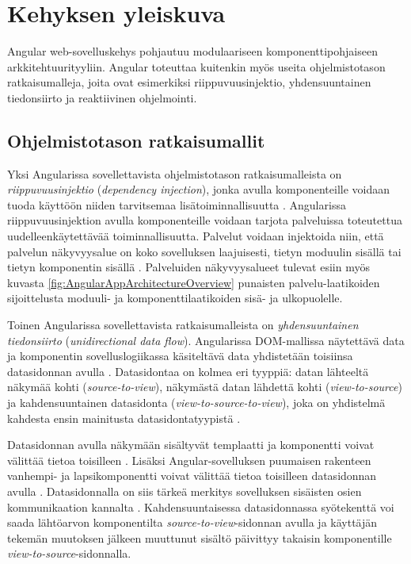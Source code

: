 \documentclass[finnish]{tktltiki2}
\theoremstyle{definition}
\theoremstyle{remark}
\numberwithin{figure}{section}
\begin{document}
\section{Kehyksen yleiskuva}

Angular web-sovelluskehys pohjautuu modulaariseen komponenttipohjaiseen arkkitehtuurityyliin. Angular toteuttaa kuitenkin myös useita ohjelmistotason ratkaisumalleja, joita ovat esimerkiksi riippuvuusinjektio, yhdensuuntainen tiedonsiirto ja reaktiivinen ohjelmointi.

\subsection{Ohjelmistotason ratkaisumallit}

Yksi Angularissa sovellettavista ohjelmistotason ratkaisumalleista on \textit{riippuvuusinjektio} (\textit{dependency injection}), jonka avulla komponenteille voidaan tuoda käyttöön niiden tarvitsemaa lisätoiminnallisuutta \cite{DependencyInjectionPattern}. Angularissa riippuvuusinjektion avulla komponenteille voidaan tarjota palveluissa toteutettua uudelleenkäytettävää toiminnallisuutta. Palvelut voidaan injektoida niin, että palvelun näkyvyysalue on koko sovelluksen laajuisesti, tietyn moduulin sisällä tai tietyn komponentin sisällä \cite{DependencyInjection}. Palveluiden näkyvyysalueet tulevat esiin myös kuvasta \ref{fig:AngularAppArchitectureOverview} punaisten palvelu-laatikoiden sijoittelusta moduuli- ja komponenttilaatikoiden sisä- ja ulkopuolelle.

Toinen Angularissa sovellettavista ratkaisumalleista on \textit{yhdensuuntainen tiedonsiirto} (\textit{unidirectional data flow}). Angularissa DOM-mallissa näytettävä data ja komponentin sovelluslogiikassa käsiteltävä data yhdistetään toisiinsa datasidonnan avulla \cite{TemplateSyntax}. Datasidontaa on kolmea eri tyyppiä: datan lähteeltä näkymää kohti (\textit{source-to-view}), näkymästä datan lähdettä kohti (\textit{view-to-source}) ja kahdensuuntainen datasidonta (\textit{view-to-source-to-view}), joka on yhdistelmä kahdesta ensin mainitusta datasidontatyypistä \cite{TemplateSyntax}. 

Datasidonnan avulla näkymään sisältyvät templaatti ja komponentti voivat välittää tietoa toisilleen \cite{ArchitectureComponents}. Lisäksi Angular-sovelluksen puumaisen rakenteen vanhempi- ja lapsikomponentti voivat välittää tietoa toisilleen datasidonnan avulla \cite{ArchitectureComponents}. Datasidonnalla on siis tärkeä merkitys sovelluksen sisäisten osien kommunikaation kannalta \cite{ArchitectureComponents}. Kahdensuuntaisessa datasidonnassa syötekenttä voi saada lähtöarvon komponentilta \textit{source-to-view}-sidonnan avulla ja käyttäjän tekemän muutoksen jälkeen muuttunut sisältö päivittyy takaisin komponentille \textit{view-to-source}-sidonnalla. 
\end{document}

